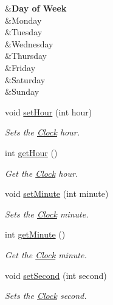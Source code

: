 \begin{DoxyCompactItemize}
\begin{DoxyCompactList}
 \begin{TabularC}{2}
\hline
{}\PBS{}&{\bf Day of Week}\\
\PBS{} &Monday \\
\PBS{} &Tuesday \\
\PBS{} &Wednesday \\
\PBS{} &Thursday \\
\PBS{} &Friday \\
\PBS{} &Saturday \\
\PBS{} &Sunday \\
\end{TabularC}
\end{DoxyCompactList}\item 
void \hyperlink{class_clock_ac0eb2849ca938074df4d3f81d18861a1}{set\-Hour} (int hour)
\begin{DoxyCompactList}\small\item\em Sets the \hyperlink{class_clock}{Clock} hour. \end{DoxyCompactList}\item 
int \hyperlink{class_clock_aba95277d2adba907d4c9fd0fa18db62b}{get\-Hour} ()
\begin{DoxyCompactList}\small\item\em Get the \hyperlink{class_clock}{Clock} hour. \end{DoxyCompactList}\item 
void \hyperlink{class_clock_a4107811dfffbafaea5b54fcdf236c5f1}{set\-Minute} (int minute)
\begin{DoxyCompactList}\small\item\em Sets the \hyperlink{class_clock}{Clock} minute. \end{DoxyCompactList}\item 
int \hyperlink{class_clock_a8b874de3e806c727ad06f8e696f1f875}{get\-Minute} ()
\begin{DoxyCompactList}\small\item\em Get the \hyperlink{class_clock}{Clock} minute. \end{DoxyCompactList}\item 
void \hyperlink{class_clock_a2f5112d5b6060a6a88d006a3a57cf29b}{set\-Second} (int second)
\begin{DoxyCompactList}\small\item\em Sets the \hyperlink{class_clock}{Clock} second. \end{DoxyCompactList}\item 

\end{DoxyCompactItemize}
